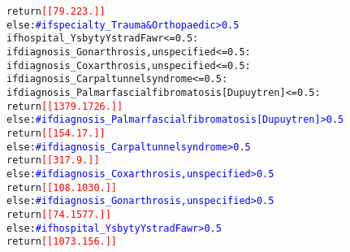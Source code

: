 \documentclass[thesis.tex]{subfiles}
\begin{document}
{\begin{alltt}
                    return \textcolor{red}{[[ 79. 223.]]}
        else:  \textcolor{blue}{# if specialty_Trauma & Orthopaedic > 0.5}
            if hospital_Ysbyty Ystrad Fawr <= 0.5:
                if diagnosis_Gonarthrosis, unspecified <= 0.5:
                    if diagnosis_Coxarthrosis, unspecified <= 0.5:
                        if diagnosis_Carpal tunnel syndrome <= 0.5:
                            if diagnosis_Palmar fascial fibromatosis [Dupuytren] <= 0.5:
                                return \textcolor{red}{[[1379. 1726.]]}
                            else:  \textcolor{blue}{# if diagnosis_Palmar fascial fibromatosis [Dupuytren] > 0.5}
                                return \textcolor{red}{[[154.  17.]]}
                        else:  \textcolor{blue}{# if diagnosis_Carpal tunnel syndrome > 0.5}
                            return \textcolor{red}{[[317.   9.]]}
                    else:  \textcolor{blue}{# if diagnosis_Coxarthrosis, unspecified > 0.5}
                        return \textcolor{red}{[[ 108. 1030.]]}
                else:  \textcolor{blue}{# if diagnosis_Gonarthrosis, unspecified > 0.5}
                    return \textcolor{red}{[[  74. 1577.]]}
            else:  \textcolor{blue}{# if hospital_Ysbyty Ystrad Fawr > 0.5}
                return \textcolor{red}{[[1073.  156.]]}
\end{alltt}
}
\end{document}
